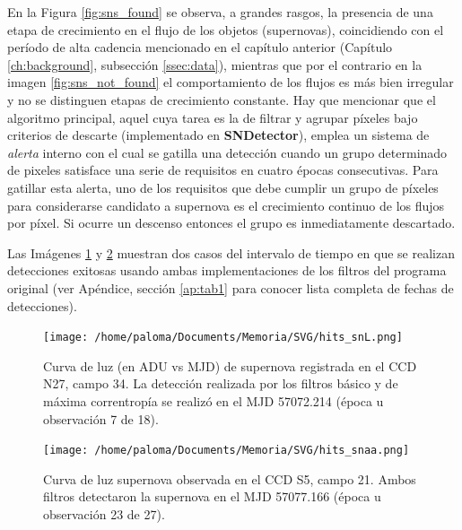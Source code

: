 En la Figura \ref{fig:sns_found} se observa, a grandes rasgos, la presencia de una etapa de crecimiento en el flujo de los objetos (supernovas), coincidiendo con el per\'iodo de alta cadencia mencionado en el cap\'itulo anterior (Cap\'itulo \ref{ch:background}, subsecci\'on \ref{ssec:data}), mientras que por el contrario en la imagen \ref{fig:sns_not_found} el comportamiento de los flujos es m\'as bien irregular y no se distinguen etapas de crecimiento constante. Hay que mencionar que el algoritmo principal, aquel cuya tarea es la de filtrar y agrupar p\'ixeles bajo criterios de descarte (implementado en \textbf{SNDetector}), emplea un sistema de \textit{alerta} interno con el cual se gatilla una detecci\'on cuando un grupo determinado de pixeles satisface una serie de requisitos en cuatro \'epocas consecutivas. Para gatillar esta alerta, uno de los requisitos que debe cumplir un grupo de p\'ixeles para considerarse candidato a supernova es el crecimiento continuo de los flujos por p\'ixel. Si ocurre un descenso entonces el grupo es inmediatamente descartado.  
\bigskip

Las Im\'agenes \ref{fig:orig_det_snL} y \ref{fig:orig_det_snaa} muestran dos casos del intervalo de tiempo en que se realizan detecciones exitosas usando ambas implementaciones de los filtros del programa original (ver Ap\'endice, secci\'on \ref{ap:tab1} para conocer lista completa de fechas de detecciones).
\bigskip

\begin{figure}[h!]
\centering
\texttt{[image: /home/paloma/Documents/Memoria/SVG/hits\_snL.png]}
\caption{Curva de luz (en ADU vs MJD) de supernova registrada en el CCD N27, campo 34. La detecci\'on realizada por los filtros b\'asico y de m\'axima correntrop\'ia se realiz\'o en el MJD 57072.214 (\'epoca u observaci\'on 7 de 18). }
\label{fig:orig_det_snL}
\end{figure}


\begin{figure}[h!]
\centering
\texttt{[image: /home/paloma/Documents/Memoria/SVG/hits\_snaa.png]}
\caption{Curva de luz supernova observada en el CCD S5, campo 21. Ambos filtros detectaron la supernova en el MJD 57077.166 (\'epoca u observaci\'on 23 de 27).}
\label{fig:orig_det_snaa}
\end{figure}
\bigskip

